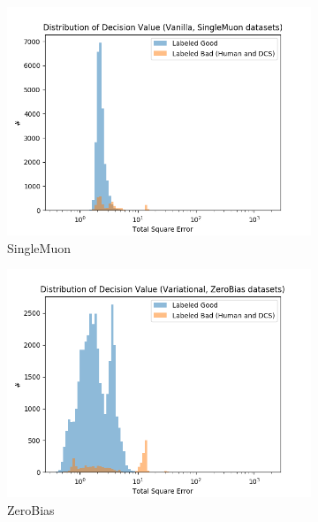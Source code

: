 \begin{figure}[h!]
\centering
    \begin{subfigure}[b]{0.49\linewidth}
        \includegraphics[width=\linewidth]{images/reco/2018/feature_2/se_dist_Vanilla1f2_SingleMuon_unlog.png}
        \caption{SingleMuon}
    \end{subfigure}
    \begin{subfigure}[b]{0.49\linewidth}
        \includegraphics[width=\linewidth]{images/reco/2018/feature_2/se_dist_Variational1f2_ZeroBias_unlog.png}
        \caption{ZeroBias}
    \end{subfigure}
    \begin{subfigure}[b]{0.49\linewidth}

\end{subfigure}
\end{figure}
